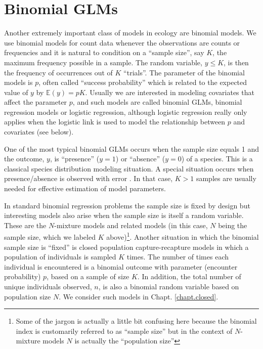 



\section{Binomial GLMs}

Another extremely important class of models in ecology are
binomial models. We use binomial models for count data whenever the
observations are counts or frequencies and it is natural to condition
on a ``sample size'', say $K$, the maximum frequency possible in a sample.
 The random variable, $y \le K$, is then the
frequency of occurrences out of $K$ ``trials''. The parameter of the binomial
models is $p$, often called ``success probability'' which is related
to the expected value of $y$ by $\mathbb{E}(y) = pK$. Usually we are interested
in modeling covariates that affect the parameter $p$, and such models
are called binomial GLMs, binomial
regression models or logistic regression, although logistic regression
 really only applies when the logistic link is used to model
the relationship between $p$ and covariates (see below).

One of the most typical binomial GLMs occurs when the sample size
equals 1 and the outcome, $y$, is ``presence'' ($y=1$) or ``absence''
($y=0$) of a species. This is a classical species distribution
modeling situation. A special situation occurs when presence/absence
is observed with error \citep{mackenzie_etal:2002,tyre_etal:2003}.
In that case, $K>1$ samples
are usually needed for effective estimation of model parameters.

 In standard binomial regression problems the sample size
is fixed by design but interesting models also arise when the sample
size is itself a random variable. These are the $N$-mixture models
\citep{royle:2004biom, kery_etal:2005, royle_dorazio:2008, kery:2010}
and related models (in this case, $N$ being the sample size,
which we labeled $K$ above)\footnote{Some of the jargon is actually a little
bit confusing here
because the binomial index is customarily referred to as ``sample size''
but in the context of $N$-mixture models $N$ is actually the
``population size''}.
Another
situation in which the binomial sample size is ``fixed'' is closed
population capture-recapture models in which a population of
individuals is sampled $K$ times.  The number of times each individual
is encountered is a binomial outcome with parameter (encounter
probability) $p$, based on a sample of size $K$.  In addition, the
total number of unique individuals observed, $n$, is also a binomial
random variable based on population size $N$.  We consider such
models in Chapt. \ref{chapt.closed}.


